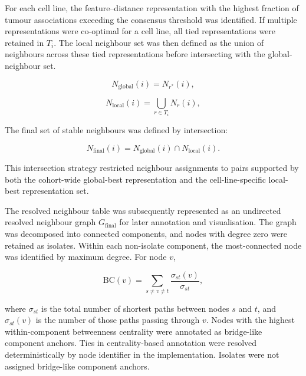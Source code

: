 For each cell line, the feature--distance representation with the highest
fraction of tumour associations exceeding the consensus threshold was
identified. If multiple representations were co-optimal for a cell line, all
tied representations were retained in \(T_i\). The local neighbour set was then
defined as the union of neighbours across these tied representations before
intersecting with the global-neighbour set.

\begin{equation}
    N_{\mathrm{global}}(i) =
    N_{r^{\ast}}(i),
    \label{eq:global-neighbours}
\end{equation}

\begin{equation}
    N_{\mathrm{local}}(i) =
    \bigcup_{r \in T_i}
    N_r(i),
    \label{eq:local-neighbours}
\end{equation}

The final set of stable neighbours was defined by intersection:

\begin{equation}
    N_{\mathrm{final}}(i) =
    N_{\mathrm{global}}(i)
    \cap
    N_{\mathrm{local}}(i).
    \label{eq:stable-neighbours}
\end{equation}

This intersection strategy restricted neighbour assignments to pairs supported
by both the cohort-wide global-best representation and the cell-line-specific
local-best representation set.

The resolved neighbour table was subsequently represented as an undirected
resolved neighbour graph \(G_{\mathrm{final}}\) for later annotation and
visualisation. The graph was decomposed into connected components, and
nodes with degree zero were retained as isolates. Within each non-isolate
component, the most-connected node was identified by maximum degree.
For node $v$,

\begin{equation}
    \mathrm{BC}(v) =
    \sum_{s \neq v \neq t}
    \frac{\sigma_{st}(v)}{\sigma_{st}},
    \label{eq:betweenness}
\end{equation}

where $\sigma_{st}$ is the total number of shortest paths between
nodes $s$ and $t$, and $\sigma_{st}(v)$ is the number of those paths
passing through $v$.
Nodes with the highest within-component betweenness centrality were annotated
as bridge-like component anchors.
Ties in centrality-based annotation were resolved deterministically by node identifier in the implementation. Isolates were not assigned bridge-like component anchors.

